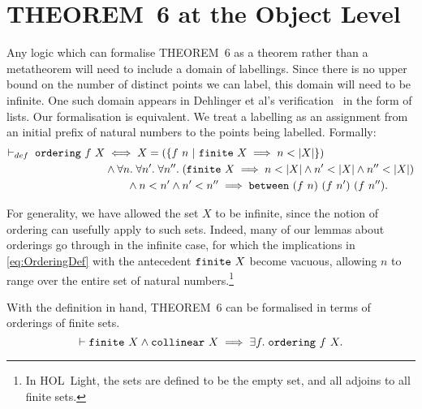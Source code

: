 \section{THEOREM~6 at the Object Level}
Any logic which can formalise THEOREM~6 as a theorem rather than a metatheorem will need to include a domain of labellings. Since there is no upper bound on the number of distinct points we can label, this domain will need to be infinite. One such domain appears in Dehlinger et al's verification~\cite{DehlingerFOG} in the form of lists. Our formalisation is equivalent. We treat a labelling as an assignment from an initial prefix of natural numbers to the points being labelled. Formally:
\label{sec:OrderingDef}
\begin{equation}\label{eq:OrderingDef}
  \begin{split}
    \vdash_{def}\;\code{ordering}\ f\ X &\iff X = \left(\left\{f\ n\ \vert\ \code{finite}\ X \implies n < \left|X\right|\right\}\right)\\
    &\wedge \forall n.\;\forall n'.\;\forall n''.\; (\code{finite}\ X \implies n < \left|X\right| \wedge n' < \left|X\right| \wedge n'' < \left|X\right|)\\
    &\qquad\wedge n < n' \wedge n' < n'' \implies \between{(f\ n)}{(f\ n')}{(f\ n'')}.
    \end{split}
\end{equation}

For generality, we have allowed the set $X$ to be infinite, since the notion of ordering can usefully apply to such sets. Indeed, many of our lemmas about orderings go through in the infinite case, for which the implications in \eqref{eq:OrderingDef} with the antecedent $\texttt{finite}\ X$ become vacuous, allowing $n$ to range over the entire set of natural numbers.\footnote{In HOL~Light, the  sets are defined to be the empty set, and all adjoins to all finite sets.} 

With the definition in hand, THEOREM~6 can be formalised in terms of orderings of finite sets.
\begin{equation*}
  \vdash\texttt{finite}\ X \wedge\texttt{collinear}\ X \implies \exists f.\; \texttt{ordering}\ f\ X.
\end{equation*}

